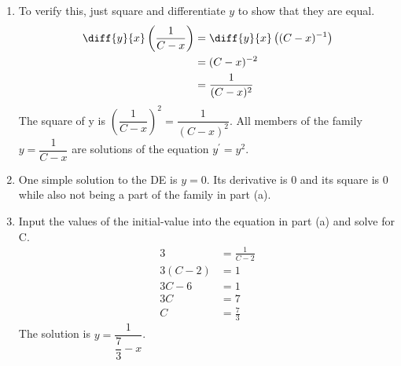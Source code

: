 \documentclass{article}
\begin{document}
\begin{enumerate}[label=\textbf{(1.\arabic*)}]
\begin{enumerate}
\item To verify this, just square and differentiate $y$ to show that they are equal.
\begin{align*}
\diff{y}{x} \left(\frac{1}{C-x}\right) &= \diff{y}{x} \left(({C-x})^{-1}\right)\\
&= (C-x)^{-2}\\
&= \frac{1}{(C-x)^{2}}
\end{align*}
The square of y is $\left(\dfrac{1}{C-x}\right)^2 = \dfrac{1}{(C-x)^2}$. All members of the family $y=\dfrac{1}{C-x}$ are solutions of the equation $y^\prime = y^2$. 
\item One simple solution to the DE is $y=0$. Its derivative is 0 and its square is 0 while also not being a part of the family in part (a).
\item Input the values of the initial-value into the equation in part (a) and solve for C.
\begin{align*}
3 &= \frac{1}{C-2}\\
3(C-2) &= 1\\
3C-6 &= 1\\
3C &= 7\\
C &= \frac{7}{3}
\end{align*}
The solution is $y=\dfrac{1}{\dfrac{7}{3}-x}$.
\end{enumerate}

\newpage


\end{enumerate}
\end{document}

